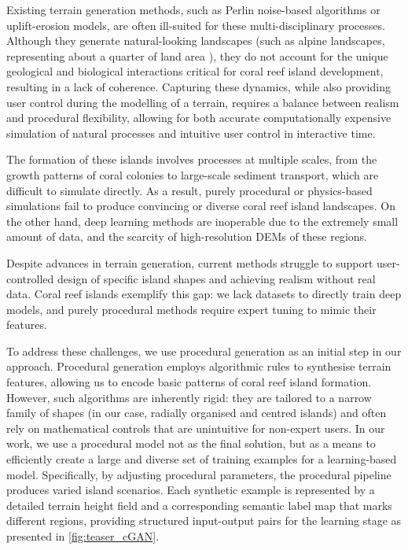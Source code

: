 Existing terrain generation methods, such as Perlin noise-based algorithms or uplift-erosion models, are often ill-suited for these multi-disciplinary processes. Although they generate natural-looking landscapes (such as alpine landscapes, representing about a quarter of land area \cite{Korner2014}), they do not account for the unique geological and biological interactions critical for coral reef island development, resulting in a lack of coherence. Capturing these dynamics, while also providing user control during the modelling of a terrain, requires a balance between realism and procedural flexibility, allowing for both accurate computationally expensive simulation of natural processes and intuitive user control in interactive time.

The formation of these islands involves processes at multiple scales, from the growth patterns of coral colonies to large-scale sediment transport, which are difficult to simulate directly. As a result, purely procedural or physics-based simulations fail to produce convincing or diverse coral reef island landscapes. On the other hand, deep learning methods are inoperable due to the extremely small amount of data, and the scarcity of high-resolution DEMs of these regions.

Despite advances in terrain generation, current methods struggle to support user-controlled design of specific island shapes and achieving realism without real data. Coral reef islands exemplify this gap: we lack datasets to directly train deep models, and purely procedural methods require expert tuning to mimic their features.

To address these challenges, we use procedural generation as an initial step in our approach. Procedural generation employs algorithmic rules to synthesise terrain features, allowing us to encode basic patterns of coral reef island formation. However, such algorithms are inherently rigid: they are tailored to a narrow family of shapes (in our case, radially organised and centred islands) and often rely on mathematical controls that are unintuitive for non-expert users. In our work, we use a procedural model not as the final solution, but as a means to efficiently create a large and diverse set of training examples for a learning-based model. Specifically, by adjusting procedural parameters, the procedural pipeline produces varied island scenarios. Each synthetic example is represented by a detailed terrain height field and a corresponding semantic label map that marks different regions, providing structured input-output pairs for the learning stage as presented in \cref{fig:teaser_cGAN}.

